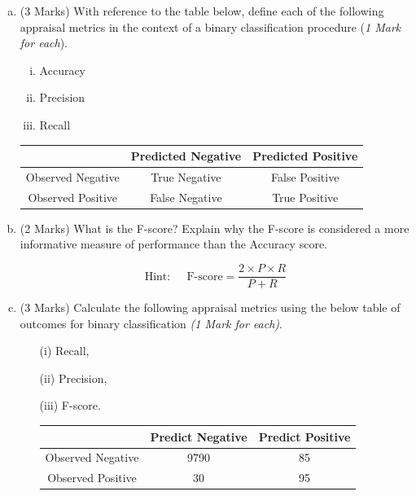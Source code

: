 \documentclass[a4paper,12pt]{article}
\begin{document}
\begin{enumerate}

 
	\begin{enumerate}[(a)]



		\item (3 Marks) With reference to the table below, define each of the following appraisal metrics in the context of a binary classification procedure (\textit{1 Mark for each}).
		\begin{enumerate}[(i)]
			\item Accuracy
			\item Precision
			\item Recall
		\end{enumerate}
		\begin{center}
		\begin{tabular}{|c|c|c|}
			\hline  & Predicted Negative & Predicted Positive \\ 
			\hline Observed Negative & True Negative & False Positive \\ 
			\hline Observed Positive & False Negative & True Positive \\ 
			\hline 
		\end{tabular} 
	\end{center}
\bigskip
		\item (2 Marks) What is the F-score? Explain why the F-score is considered a more informative measure of performance than the Accuracy score.
		
		\[ \mbox{Hint:    }\;\;\;\; \mbox{F-score} = \frac{2\times P \times R}{P + R} \]
		
\bigskip		
\item (3 Marks) Calculate the following appraisal metrics using the below table of outcomes for binary classification \textit{(1 Mark for each)}.
\begin{itemize}	
		\item[(i)] 	Recall,
		\item[(ii)] Precision,
		\item[(iii)] F-score.
\smallskip
\begin{center}
	\begin{tabular}{|c|c|c|}
		\hline  & \phantom{spa}Predict Negative\phantom{spa} & \phantom{spa}Predict Positive\phantom{spa} \\ 
		\hline\phantom{spa} Observed Negative \phantom{spa}&	9790	&	85	\\ 
		\hline \phantom{spa}Observed Positive\phantom{spa} & 	30	&	95	\\ 
		\hline 
	\end{tabular} 
\end{center}	
		\end{itemize}
	

\end{enumerate}
\end{enumerate}
\end{document}
